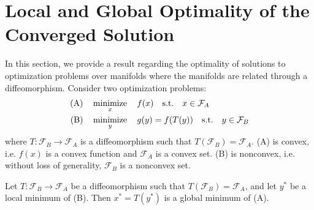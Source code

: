 \documentclass{IEEEtran}
\begin{document}
\section{Local and Global Optimality of the Converged Solution}

In this section, we provide a result regarding the optimality of solutions to optimization problems over manifolds where the manifolds are related through a diffeomorphism. 
Consider two optimization problems:
\begin{subequations}
\begin{align}
\text{(A)} \quad & \operatorname*{minimize}_{x} \quad f(x) 
\quad \text{s.t.} \quad x \in \mathcal{F}_A \\
\text{(B)} \quad & \operatorname*{minimize}_{y} \quad g(y) = f(T(y)) \quad \text{s.t.} \quad y \in \mathcal{F}_B
\end{align}
\end{subequations}
where $T: \mathcal{F}_B \rightarrow \mathcal{F}_A$ is a diffeomorphism such that $T(\mathcal{F}_B) = \mathcal{F}_A$. (A) is convex, i.e. \(f(x)\) is a convex function and $\mathcal{F}_A$ is a convex set. (B) is nonconvex, i.e. without loss of generality, \(\mathcal{F}_B\) is a nonconvex set.

\begin{proposition}
\label{prop:global_optimality_diffeomorphism}
Let $T: \mathcal{F}_B \rightarrow \mathcal{F}_A$ be a diffeomorphism such that $T(\mathcal{F}_B) = \mathcal{F}_A$, and let $y^*$ be a local minimum of (B). Then $x^* = T(y^*)$ is a global minimum of (A).
\end{proposition}
\end{document}
